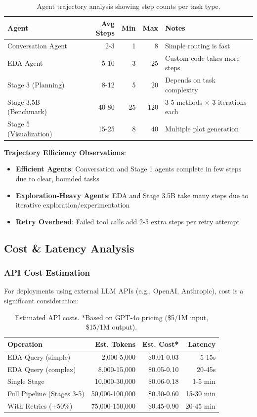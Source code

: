 \documentclass[11pt,a4paper]{article}
\begin{document}
\begin{table}[H]
\centering
\small
\begin{tabular}{lrrrl}
\toprule
\textbf{Agent} & \textbf{Avg Steps} & \textbf{Min} & \textbf{Max} & \textbf{Notes} \\
\midrule
Conversation Agent & 2-3 & 1 & 8 & Simple routing is fast \\
EDA Agent & 5-10 & 3 & 25 & Custom code takes more steps \\
Stage 3 (Planning) & 8-12 & 5 & 20 & Depends on task complexity \\
Stage 3.5B (Benchmark) & 40-80 & 25 & 120 & 3-5 methods × 3 iterations each \\
Stage 5 (Visualization) & 15-25 & 8 & 40 & Multiple plot generation \\
\bottomrule
\end{tabular}
\caption{Agent trajectory analysis showing step counts per task type.}
\end{table}

\textbf{Trajectory Efficiency Observations}:
\begin{itemize}
    \item \textbf{Efficient Agents}: Conversation and Stage 1 agents complete in few steps due to clear, bounded tasks
    \item \textbf{Exploration-Heavy Agents}: EDA and Stage 3.5B take many steps due to iterative exploration/experimentation
    \item \textbf{Retry Overhead}: Failed tool calls add 2-5 extra steps per retry attempt
\end{itemize}

\subsection{Cost \& Latency Analysis}

\subsubsection{API Cost Estimation}

For deployments using external LLM APIs (e.g., OpenAI, Anthropic), cost is a significant consideration:

\begin{table}[H]
\centering
\small
\begin{tabular}{lrrr}
\toprule
\textbf{Operation} & \textbf{Est. Tokens} & \textbf{Est. Cost*} & \textbf{Latency} \\
\midrule
EDA Query (simple) & 2,000-5,000 & \$0.01-0.03 & 5-15s \\
EDA Query (complex) & 8,000-15,000 & \$0.05-0.10 & 20-45s \\
Single Stage & 10,000-30,000 & \$0.06-0.18 & 1-5 min \\
Full Pipeline (Stages 3-5) & 50,000-100,000 & \$0.30-0.60 & 15-30 min \\
With Retries (+50\%) & 75,000-150,000 & \$0.45-0.90 & 20-45 min \\
\bottomrule
\end{tabular}
\caption{Estimated API costs. *Based on GPT-4o pricing (\$5/1M input, \$15/1M output).}
\end{table}
\end{document}
